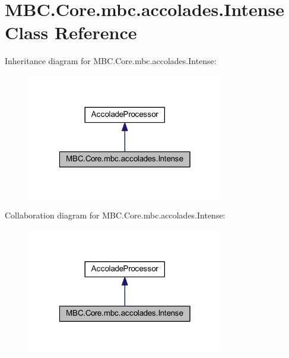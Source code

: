 \hypertarget{class_m_b_c_1_1_core_1_1mbc_1_1accolades_1_1_intense}{\section{M\-B\-C.\-Core.\-mbc.\-accolades.\-Intense Class Reference}
\label{class_m_b_c_1_1_core_1_1mbc_1_1accolades_1_1_intense}
}


Inheritance diagram for M\-B\-C.\-Core.\-mbc.\-accolades.\-Intense\-:\nopagebreak
\begin{figure}[H]
\begin{center}
\leavevmode
\includegraphics[width=244pt]{class_m_b_c_1_1_core_1_1mbc_1_1accolades_1_1_intense__inherit__graph}
\end{center}
\end{figure}


Collaboration diagram for M\-B\-C.\-Core.\-mbc.\-accolades.\-Intense\-:\nopagebreak
\begin{figure}[H]
\begin{center}
\leavevmode
\includegraphics[width=244pt]{class_m_b_c_1_1_core_1_1mbc_1_1accolades_1_1_intense__coll__graph}
\end{center}
\end{figure}
